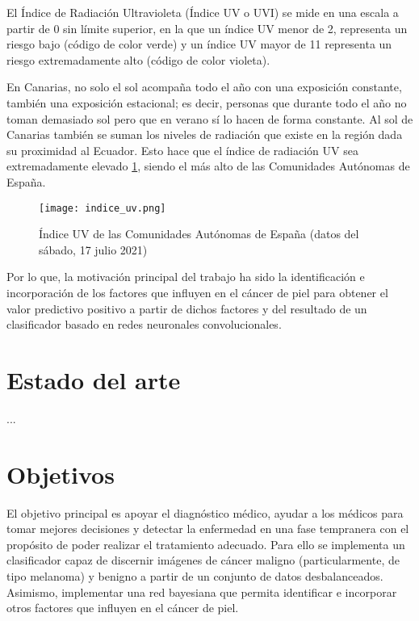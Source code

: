 El Índice de Radiación Ultravioleta (Índice UV o UVI) se mide en una escala a partir de 0 sin límite superior, en la que un índice UV menor de 2, representa un riesgo bajo (código de color verde) y un índice UV mayor de 11 representa un riesgo extremadamente alto (código de color violeta).

En Canarias, no solo el sol acompaña todo el año con una exposición constante, también una exposición estacional; es decir, personas que durante todo el año no toman demasiado sol pero que en verano sí lo hacen de forma constante. Al sol de Canarias también se suman los niveles de radiación que existe en la región dada su proximidad al Ecuador. Esto hace que el índice de radiación UV sea extremadamente elevado \ref{indice_uv}, siendo el más alto de las Comunidades Autónomas de España.

\begin{figure}[htbp]
    \centering
    \textbf{}\par\medskip
    \texttt{[image: indice\_uv.png]}
    \caption{Índice UV de las Comunidades Autónomas de España (datos del sábado, 17 julio 2021) \cite{uvi}}
    \label{indice_uv}
\end{figure}

Por lo que, la motivación principal del trabajo ha sido la identificación e incorporación de los factores que influyen en el cáncer de piel para obtener el valor predictivo positivo a partir de dichos factores y del resultado de un clasificador basado en redes neuronales convolucionales.

\section{Estado del arte} 
...

\section{Objetivos} 
El objetivo principal es apoyar el diagnóstico médico, ayudar a los médicos para tomar mejores decisiones y detectar la enfermedad en una fase tempranera con el propósito de poder realizar el tratamiento adecuado. Para ello se implementa un clasificador capaz de discernir imágenes de cáncer maligno (particularmente, de tipo melanoma) y benigno a partir de un conjunto de datos desbalanceados. Asimismo, implementar una red bayesiana que permita identificar e incorporar otros factores que influyen en el cáncer de piel.

